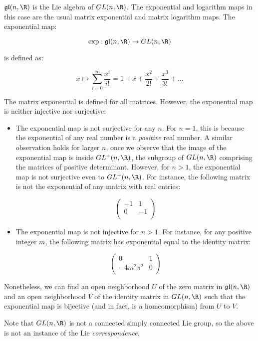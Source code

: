 \documentclass{ucetd}
\begin{document}
$\mathfrak{g}\mathfrak{l}(n,\R)$ is the Lie algebra of $GL(n,\R)$. The
exponential and logarithm maps in this case are the usual matrix
exponential and matrix logarithm maps. The exponential map:

$$\exp: \mathfrak{g}\mathfrak{l}(n,\R) \to GL(n,\R)$$

is defined as:

$$x \mapsto \sum_{i=0}^\infty \frac{x^i}{i!} = 1 + x + \frac{x^2}{2!} + \frac{x^3}{3!} + \dots$$

The matrix exponential is defined for all matrices. However, the
exponential map is neither injective nor surjective:

\begin{itemize}
\item The exponential map is not surjective for any $n$. For $n = 1$,
  this is because the exponential of any real number is a {\em
    positive} real number. A similar observation holds for larger $n$,
  once we observe that the image of the exponential map is inside
  $GL^+(n,\R)$, the subgroup of $GL(n,\R)$ comprising the matrices of
  positive determinant. However, for $n > 1$, the exponential map is
  not surjective even to $GL^+(n,\R)$. For instance, the following
  matrix is not the exponential of any matrix with real entries:

  $$\begin{pmatrix} -1 & 1 \\ 0 & -1 \\\end{pmatrix}$$

\item The exponential map is not injective for $n > 1$. For instance,
  for any positive integer $m$, the following matrix has exponential
  equal to the identity matrix:

  $$\begin{pmatrix} 0 & 1 \\ -4m^2\pi^2 & 0 \\\end{pmatrix}$$
\end{itemize}

Nonetheless, we can find an open neighborhood $U$ of the zero matrix
in $\mathfrak{g}\mathfrak{l}(n,\R)$ and an open neighborhood $V$ of
the identity matrix in $GL(n,\R)$ such that the exponential map is
bijective (and in fact, is a homeomorphism) from $U$ to $V$.

Note that $GL(n,\R)$ is not a connected simply connected Lie group, so
the above is not an instance of the Lie {\em correspondence}.
\end{document}
